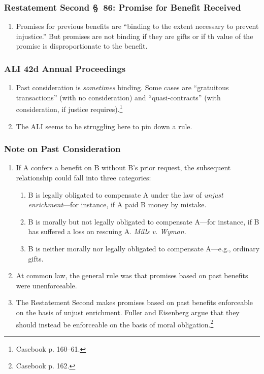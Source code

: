 \subsubsection{Restatement Second \S\ 86: Promise for Benefit Received}

\begin{enumerate}
    \item Promises for previous benefits are ``binding to the extent necessary 
    to prevent injustice.'' But promises are not binding if they are gifts or 
    if th value of the promise is disproportionate to the benefit.
\end{enumerate}

\subsubsection{ALI 42d Annual Proceedings}

\begin{enumerate}
    \item Past consideration is \emph{sometimes} binding. Some cases are 
    ``gratuitous transactions'' (with no consideration) and 
    ``quasi-contracts'' (with consideration, if justice 
    requires).\footnote{Casebook p. 160--61.}
    \item The ALI seems to be struggling here to pin down a rule.
\end{enumerate}

\subsubsection{Note on Past Consideration}

\begin{enumerate}
    \item If A confers a benefit on B without B's prior request, the 
    subsequent relationship could fall into three categories:
    \begin{enumerate}
        \item B is legally obligated to compensate A under the law of 
        \emph{unjust enrichment}---for instance, if A paid B money by mistake.
        \item B is morally but not legally obligated to compensate A---for 
        instance, if B has suffered a loss on rescuing A. \emph{Mills v. 
        Wyman.}
        \item B is neither morally nor legally obligated to compensate 
        A---e.g., ordinary gifts.
    \end{enumerate}
    \item At common law, the general rule was that promises based on past 
    benefits were unenforceable.
    \item The Restatement Second makes promises based on past benefits 
    enforceable on the basis of unjust enrichment. Fuller and Eisenberg argue 
    that they should instead be enforceable on the basis of moral 
    obligation.\footnote{Casebook p. 162.}
\end{enumerate}


